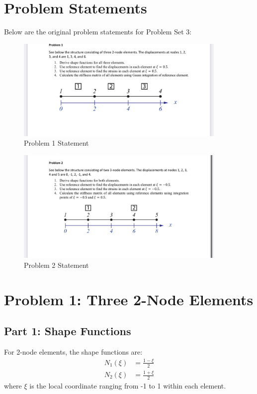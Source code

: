 \documentclass[12pt,a4paper]{article}
\begin{document}
\section*{Problem Statements}
Below are the original problem statements for Problem Set 3:

\begin{figure}[H]
\centering
\includegraphics[width=0.9\textwidth]{IMG_5525.jpeg}
\caption{Problem 1 Statement}
\label{fig:problem1_statement}
\end{figure}

\begin{figure}[H]
\centering
\includegraphics[width=0.9\textwidth]{IMG_5526.jpeg}
\caption{Problem 2 Statement}
\label{fig:problem2_statement}
\end{figure}

\section{Problem 1: Three 2-Node Elements}

\subsection{Part 1: Shape Functions}
For 2-node elements, the shape functions are:
\begin{align}
N_1(\xi) &= \frac{1-\xi}{2} \\
N_2(\xi) &= \frac{1+\xi}{2}
\end{align}
where $\xi$ is the local coordinate ranging from -1 to 1 within each element.
\end{document}

